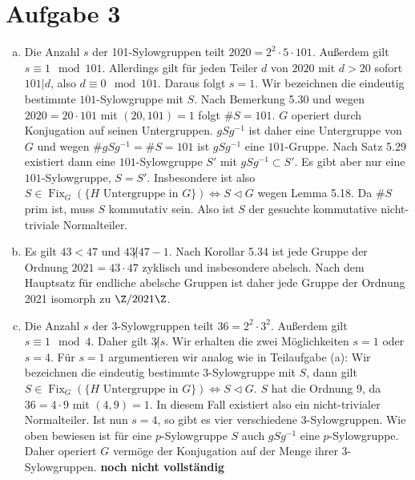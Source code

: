 \documentclass{article}
\begin{document}
\section*{Aufgabe 3}
\begin{enumerate}[(a)]
    \item Die Anzahl $s$ der 101-Sylowgruppen teilt $2020 = 2^2 \cdot 5 \cdot 101$. Außerdem gilt $s \equiv 1 \mod 101$.
    Allerdings gilt für jeden Teiler $d$ von $2020$ mit $d > 20$ sofort $101 | d$, also $d \equiv 0 \mod 101$.
    Daraus folgt $s = 1$. 
    Wir bezeichnen die eindeutig bestimmte $101$-Sylowgruppe mit $S$. Nach Bemerkung 5.30 und wegen $2020 = 20 \cdot 101$
    mit $(20, 101) = 1$ folgt $\# S = 101$.
    $G$ operiert durch Konjugation auf seinen Untergruppen.
    $gSg^{-1}$ ist daher eine Untergruppe von $G$ und wegen $\# gSg^{-1} = \# S = 101$ ist $gSg^{-1}$ eine $101$-Gruppe.
    Nach Satz 5.29 existiert dann eine $101$-Sylowgruppe $S'$ mit $gSg^{-1} \subset S'$.
    Es gibt aber nur eine $101$-Sylowgruppe, $S = S'$.
    Insbesondere ist also $S \in \operatorname{Fix}_G(\{H \text{ Untergruppe in } G\}) \Leftrightarrow S \triangleleft G$ 
    wegen Lemma 5.18. Da $\# S$ prim ist, muss $S$ kommutativ sein.
    Also ist $S$ der gesuchte kommutative nicht-triviale Normalteiler.
    \item Es gilt $43 < 47$ und $43 \not | 47-1$. Nach Korollar 5.34 ist jede Gruppe der Ordnung $2021 = 43\cdot 47$ zyklisch 
    und insbesondere abelsch. Nach dem Hauptsatz für endliche abelsche Gruppen ist daher jede Gruppe der Ordnung 2021
    isomorph zu $\Z/2021\Z$.
    \item Die Anzahl $s$ der $3$-Sylowgruppen teilt $36 = 2^2\cdot 3^2$. Außerdem gilt $s \equiv 1 \mod 4$.
    Daher gilt $3 \not | s$. Wir erhalten die zwei Möglichkeiten $s = 1$ oder $s = 4$. Für $s = 1$ argumentieren wir analog wie
    in Teilaufgabe (a): Wir bezeichnen die eindeutig bestimmte $3$-Sylowgruppe mit $S$, dann gilt
    $S \in \operatorname{Fix}_G(\{H \text{ Untergruppe in } G\}) \Leftrightarrow S \triangleleft G$.
    $S$ hat die Ordnung $9$, da $36 = 4\cdot 9$ mit $(4,9) = 1$. In diesem Fall existiert also ein 
    nicht-trivialer Normalteiler.
    Ist nun $s = 4$, so gibt es vier verschiedene $3$-Sylowgruppen. 
    Wie oben bewiesen ist für eine $p$-Sylowgruppe $S$ auch $gSg^{-1}$ eine $p$-Sylowgruppe.
    Daher operiert $G$ vermöge der Konjugation auf der Menge ihrer $3$-Sylowgruppen.
    \textbf{noch nicht vollständig}
\end{enumerate}
\end{document}
